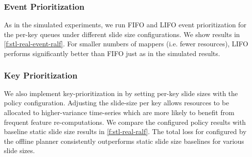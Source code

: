 \subsubsection{Event Prioritization}
As in the simulated experiments, we run FIFO and LIFO event prioritization for the per-key queues under different slide size configurations. We show results in   \cref{f:stl-real-event-ralf}. For smaller numbers of mappers (i.e. fewer resources), LIFO performs significantly better than FIFO just as in the simulated results. 

\subsubsection{Key Prioritization}
We also implement key-prioritization in \system{} by setting per-key slide sizes with the policy configuration. Adjusting the slide-size per key allows resources to be allocated to higher-variance time-series which are more likely to benefit from frequent feature re-computations. We compare the configured policy results with baseline static slide size results in \cref{f:stl-real-ralf}. The total loss for \system{} configured by the offline planner consistently outperforms static slide size baselines for various slide sizes. 





